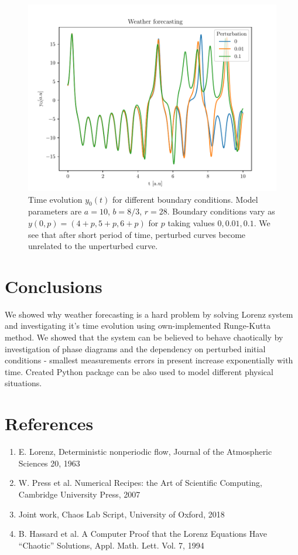 \documentclass{llncs}
\begin{document}
\begin{figure}
  \includegraphics[width=\textwidth]{images/Weather_forecasting.pdf}
  \caption{Time evolution $y_0(t)$ for different boundary conditions. Model parameters are $a=10$, $b=8/3$, $r=28$. Boundary conditions vary as $y(0, p)=(4+p, 5+p, 6+p)$
  for $p$ taking values $0, 0.01, 0.1$. We see that after short period of time, perturbed curves become unrelated to the unperturbed curve.}
\label{fig:weather}
\end{figure}

\section{Conclusions}
We showed why weather forecasting is a hard problem by solving Lorenz system and investigating it's time evolution using own-implemented Runge-Kutta method. We showed that the system
can be believed to behave chaotically by investigation of phase diagrams and the dependency on perturbed initial conditions - smallest measurements errors in present increase exponentially with time. Created Python package can be also used to model different physical situations.

\section{References}
\begin{enumerate}
  \item E. Lorenz, Deterministic nonperiodic flow, Journal of the Atmospheric Sciences 20, 1963
  \item W. Press et al. Numerical Recipes: the Art of Scientific Computing, Cambridge University Press, 2007
  \item Joint work, Chaos Lab Script, University of Oxford, 2018
  \item B. Hassard et al. A Computer Proof that the Lorenz Equations Have “Chaotic” Solutions, Appl. Math. Lett. Vol. 7, 1994
\end{enumerate}
\end{document}
